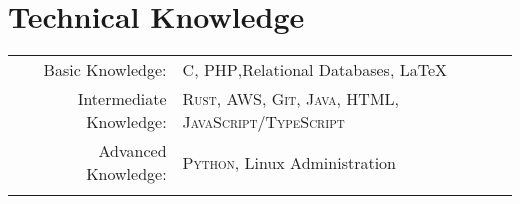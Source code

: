 \documentclass[letterpaper,10pt]{article}
\begin{document}
\pagestyle{plain}
\thispagestyle{fancy}


\section{Technical Knowledge}
\begin{tabular}{rl}
	Basic Knowledge:        & \textsc{C, PHP},Relational Databases, \LaTeX                        \\
	Intermediate Knowledge: & \textsc{Rust}, AWS, \textsc{Git, Java, HTML, JavaScript/TypeScript} \\
	Advanced Knowledge:     & \textsc{Python}, Linux Administration                               \\\\
\end{tabular}

\end{document}

